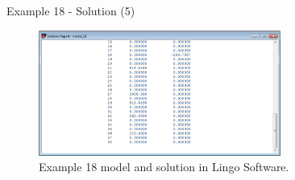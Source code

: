 \begin{frame}{Example 18 - Solution (5)}
\begin{figure}
    \includegraphics[width=300px]{slides/ex18/screenshot_e.png}
    \caption{Example 18 model and solution in Lingo Software.}
\end{figure}
\end{frame}
